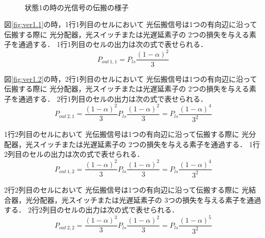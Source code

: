 \begin{itemize}
\begin{figure}[t!]
\begin{center}
{\label{fig:ver1.2}}\\
\caption{状態1の時の光信号の伝搬の様子}
\label{fig:ver1}
\end{center}
\end{figure}

図\ref{fig:ver1.1}の時，1行1列目のセルにおいて
光伝搬信号は1つの有向辺に沿って伝搬する際に
光分配器，光スイッチまたは光遅延素子の
2つの損失を与える素子を通過する．
1行1列目のセルの出力は次の式で表せられる．
$$P_{out\,1,1}=P_{ls}\frac{(1-\alpha)^2}{3}$$

図\ref{fig:ver1.2}の時，2行1列目のセルにおいて
光伝搬信号は1つの有向辺に沿って伝搬する際に
光分配器，光スイッチまたは光遅延素子の
2つの損失を与える素子を通過する．
2行1列目のセルの出力は次の式で表せられる．
$$P_{out\,2,1}=\frac{(1-\alpha)^2}{3}P_{ls}\frac{(1-\alpha)^2}{3}
=P_{ls}\frac{(1-\alpha)^4}{3^2}$$

1行2列目のセルにおいて
光伝搬信号は1つの有向辺に沿って伝搬する際に
光分配器，光スイッチまたは光遅延素子の
2つの損失を与える素子を通過する．
1行2列目のセルの出力は次の式で表せられる．
$$P_{out\,1,2}=\frac{(1-\alpha)^2}{3}P_{ls}\frac{(1-\alpha)^2}{3}=P_{ls}\frac{(1-\alpha)^4}{3^2}$$

2行2列目のセルにおいて
光伝搬信号は1つの有向辺に沿って伝搬する際に
光結合器，光分配器，光スイッチまたは光遅延素子の
3つの損失を与える素子を通過する．
2行2列目のセルの出力は次の式で表せられる．
$$P_{out\,2,2}=\frac{(1-\alpha)^3}{3}P_{ls}\frac{(1-\alpha)^2}{3}
=P_{ls}\frac{(1-\alpha)^5}{3^2}$$


\end{itemize}
